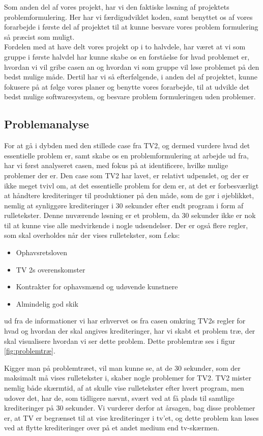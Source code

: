 Som anden del af vores projekt, har vi den faktiske løsning af projektets problemformulering. Her har vi færdigudviklet koden, samt benyttet os af vores forarbejde i første del af projektet til at kunne besvare vores problem formulering så præcist som muligt.\\
Fordelen med at have delt vores projekt op i to halvdele, har været at vi som gruppe i første halvdel har kunne skabe os en forståelse for hvad problemet er, hvordan vi vil gribe casen an og hvordan vi som gruppe vil løse problemet på den bedst mulige måde. Dertil har vi så efterfølgende, i anden del af projektet, kunne fokusere på at følge vores planer og benytte vores forarbejde, til at udvikle det bedst mulige softwaresystem, og besvare problem formuleringen uden problemer.

\subsection{Problemanalyse}
For at gå i dybden med den stillede case fra TV2, og dermed vurdere hvad det essentielle problem er, samt skabe os en problemformulering at arbejde ud fra, har vi først analyseret casen, med fokus på at identificere, hvilke mulige problemer der er. Den case som TV2 har lavet, er relativt udpenslet, og der er ikke meget tvivl om, at det essentielle problem for dem er, at det er forbesværligt at håndtere krediteringer til produktioner på den måde, som de gør i øjeblikket, nemlig at synliggøre krediteringer i 30 sekunder efter endt program i form af rulletekster. Denne nuværende løsning er et problem, da 30 sekunder ikke er nok til at kunne vise alle medvirkende i nogle udsendelser. \cite{url_case} Der er også flere regler, som skal overholdes når der vises rulletekster, som f.eks:
\begin{itemize}
    \item Ophavsretsloven
    \item TV 2s overenskomster
    \item Kontrakter for ophavsmænd og udøvende kunstnere
    \item Almindelig god skik
\end{itemize}
ud fra de informationer vi har erhvervet os fra casen omkring TV2s regler for hvad og hvordan der skal angives krediteringer, har vi skabt et problem træ, der skal visualisere hvordan vi ser dette problem. Dette problemtræ ses i figur \ref{fig:problemtræ}. 

Kigger man på problemtræet, vil man kunne se, at de 30 sekunder, som der maksimalt må vises rulletekster i, skaber nogle problemer for TV2. TV2 mister nemlig både skærmtid, af at skulle vise rulletekster efter hvert program, men udover det, har de, som tidligere nævnt, svært ved at få plads til samtlige krediteringer på 30 sekunder. Vi vurderer derfor at årsagen, bag disse problemer er, at TV er begrænset til at vise krediteringer i tv'et, og dette problem kan løses ved at flytte krediteringer over på et andet medium end tv-skærmen. 

